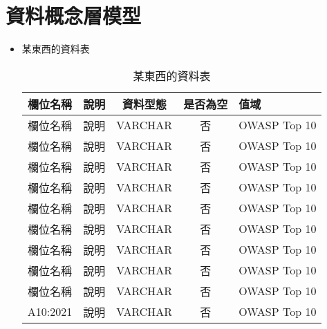 \chapter{資料概念層模型}

\begin{itemize}
    \item 某東西的資料表
        \begin{table}[h!]
            \captionsetup{justification=centering}
            \caption{某東西的資料表}
            \centering
            \renewcommand{\arraystretch}{1.2}
            \begin{tabular}{|c|l|c|c|l|}
                \hline
                \textbf{欄位名稱} & \textbf{說明} & \textbf{資料型態} & \textbf{是否為空} & \textbf{值域} \\
                \hline
                欄位名稱 & 說明 & VARCHAR & 否 & OWASP Top 10 \\
                \hline
                欄位名稱 & 說明 & VARCHAR & 否 & OWASP Top 10 \\
                \hline
                欄位名稱 & 說明 & VARCHAR & 否 & OWASP Top 10 \\
                \hline
                欄位名稱 & 說明 & VARCHAR & 否 & OWASP Top 10 \\
                \hline
                欄位名稱 & 說明 & VARCHAR & 否 & OWASP Top 10 \\
                \hline
                欄位名稱 & 說明 & VARCHAR & 否 & OWASP Top 10 \\
                \hline
                欄位名稱 & 說明 & VARCHAR & 否 & OWASP Top 10 \\
                \hline
                欄位名稱 & 說明 & VARCHAR & 否 & OWASP Top 10 \\
                \hline
                欄位名稱 & 說明 & VARCHAR & 否 & OWASP Top 10 \\
                \hline
                A10:2021 & 說明 & VARCHAR & 否 & OWASP Top 10 \\
                \hline
            \end{tabular}
        \end{table}
\end{itemize}
